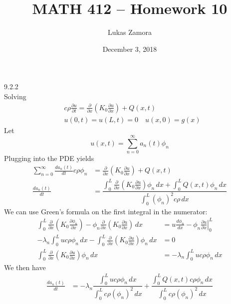 \documentclass{article}
\title{MATH 412 -- Homework 10}
\author{Lukas Zamora}
\date{December 3, 2018}
\theoremstyle{definition}
\begin{document}
    \maketitle
    
    \begin{prob}{9.2.2} $  $ \vspace{3mm} \\
        Solving
        \begin{align*}
            &c\rho\frac{\partial u}{\partial t} = \frac{\partial}{\partial x} \left( K_0 \frac{\partial u}{\partial x} \right) + Q(x,t) \\
            &u(0,t) = u(L,t) = 0 \quad u(x,0) = g(x)
        \end{align*}
        Let 
        \[
            u(x,t) = \sum\limits_{n=0}^{\infty} a_n(t) \phi_n
        \]
        Plugging into the PDE yields
        \begin{align*}
            \sum\limits_{n=0}^{\infty} \frac{da_n(t)}{dt}c\rho\phi_n &= \frac{\partial}{\partial x} \left( K_0 \frac{\partial u}{\partial x} \right) + Q(x,t) \\
            \frac{da_n(t)}{dt} &= \dfrac{\int_0^L \frac{\partial}{\partial x} \left( K_0 \frac{\partial u}{\partial x} \right) \phi_n \, dx + \int_0^L Q(x,t) \phi_n \, dx}{\int_0^L \left( \phi_n \right)^2 c\rho \, dx}
        \end{align*}
        We can use Green's formula on the first integral in the numerator:
        \begin{align*}
            \int_0^L \frac{\partial}{\partial x} \left( K_0 \frac{\partial \phi_n}{\partial x} \right) - \phi_n \frac{\partial}{\partial x}\left( K_0 \frac{\partial u}{\partial x} \right) \, dx &= u \frac{d\phi_n}{dx} - \phi_n  \left. \frac{\partial u}{\partial x} \right|_{0}^{L} \\
            -\lambda_n \int_0^L uc\rho\phi_n \, dx - \int_0^L \frac{\partial}{\partial x} \left( K_0 \frac{\partial u}{\partial x} \right) \phi_n \, dx &= 0 \\
            \int_0^L \frac{\partial}{\partial x} \left( K_0 \frac{\partial u}{\partial x} \right) \phi_n \, dx &= -\lambda_n \int_0^L uc\rho\phi_n \, dx
        \end{align*}
        We then have
        \begin{align*}
            \frac{da_n(t)}{dt} &= -\lambda_n \dfrac{ \int_0^L uc\rho\phi_n \,dx}{ \int_0^L c\rho(\phi_n)^2 \, dx} + \dfrac{ \int_0^L Q(x,t)c\rho\phi_n \, dx}{ \int_0^L c\rho(\phi_n)^2 \,dx} \\

\end{align*}
\end{prob}
\end{document}
